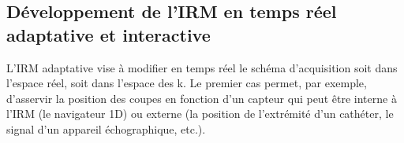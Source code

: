\subsection{Développement de l’IRM en temps réel adaptative et interactive}

L’IRM adaptative vise à modifier en temps réel le schéma d’acquisition soit dans l’espace réel, soit dans l’espace des k. Le premier cas permet, par exemple, d’asservir la position des coupes en fonction d’un capteur qui peut être interne à l’IRM (le navigateur 1D) ou externe (la position de l’extrémité d’un cathéter, le signal d’un appareil échographique, etc.).\\